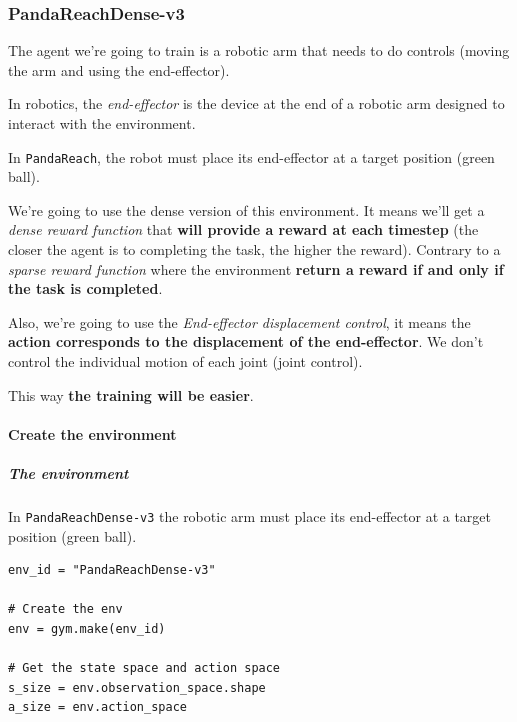 \documentclass[11pt,a4paper]{article}
\begin{document}
\subsubsection{PandaReachDense-v3}\label{pandareachdense-v3}

The agent we're going to train is a robotic arm that needs to do controls (moving the arm and using the end-effector).

In robotics, the \emph{end-effector} is the device at the end of a robotic arm designed to interact with the environment.

In \texttt{PandaReach}, the robot must place its end-effector at a target position (green ball).

We're going to use the dense version of this environment. It means we'll get a \emph{dense reward function} that \textbf{will provide a reward at each timestep} (the closer the agent is to completing the task, the higher the reward). Contrary to a \emph{sparse reward function} where the environment \textbf{return a reward if and only if the task is completed}.

Also, we're going to use the \emph{End-effector displacement control}, it means the \textbf{action corresponds to the displacement of the end-effector}. We don't control the individual motion of each joint (joint control).


This way \textbf{the training will be easier}.

\paragraph{Create the environment}\label{create-the-environment}

\subparagraph{The environment}\label{the-environment}

In \texttt{PandaReachDense-v3} the robotic arm must place its end-effector at a target position (green ball).

\begin{lstlisting}
env_id = "PandaReachDense-v3"

# Create the env
env = gym.make(env_id)

# Get the state space and action space
s_size = env.observation_space.shape
a_size = env.action_space
\end{lstlisting}
\end{document}
